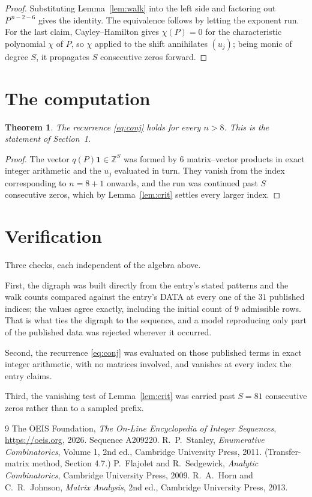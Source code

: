 \documentclass[11pt,a4paper]{article}
\theoremstyle{plain}
\newtheorem{theorem}{Theorem}
\theoremstyle{definition}
\begin{document}
\begin{proof}
Substituting Lemma~\ref{lem:walk} into the left side and factoring out
$P^{\,n-2-6}$ gives the identity. The equivalence follows by letting the exponent
run. For the last claim, Cayley--Hamilton gives $\chi(P)=0$ for the characteristic
polynomial $\chi$ of $P$, so $\chi$ applied to the shift annihilates $(u_j)$; being monic of
degree $S$, it propagates $S$ consecutive zeros forward.
\end{proof}

\section{The computation}

\begin{theorem}
The recurrence \eqref{eq:conj} holds for every $n>8$. This is the statement of
Section~1.
\end{theorem}

\begin{proof}
The vector $q(P)\mathbf{1}\in\mathbb{Z}^{S}$ was formed by $6$ matrix--vector
products in exact integer arithmetic and the $u_j$ evaluated in turn. They vanish from the
index corresponding to $n=8+1$ onwards, and the run was continued past $S$ consecutive
zeros, which by Lemma~\ref{lem:crit} settles every larger index.
\end{proof}

\section{Verification}

Three checks, each independent of the algebra above.

First, the digraph was built directly from the entry's stated patterns and the walk counts
compared against the entry's DATA at every one of the $31$ published indices; the
values agree exactly, including the initial count of $9$ admissible rows. That is
what ties the digraph to the sequence, and a model reproducing only part of the published
data was rejected wherever it occurred.

Second, the recurrence \eqref{eq:conj} was evaluated on those published terms in exact
integer arithmetic, with no matrices involved, and vanishes at every index the entry claims.

Third, the vanishing test of Lemma~\ref{lem:crit} was carried past $S=81$ consecutive
zeros rather than to a sampled prefix.

\begin{thebibliography}{9}
 The OEIS Foundation, \emph{The On-Line Encyclopedia of Integer
Sequences}, \url{https://oeis.org}, 2026. Sequence A209220.
 R.~P.~Stanley, \emph{Enumerative Combinatorics}, Volume 1, 2nd ed.,
Cambridge University Press, 2011. (Transfer-matrix method, Section 4.7.)
 P.~Flajolet and R.~Sedgewick, \emph{Analytic Combinatorics}, Cambridge
University Press, 2009.
 R.~A.~Horn and C.~R.~Johnson, \emph{Matrix Analysis}, 2nd ed., Cambridge
University Press, 2013.
\end{thebibliography}
\end{document}

